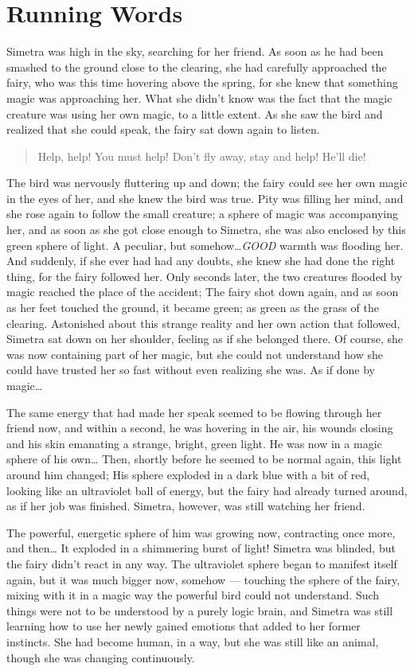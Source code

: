 \chapter{Running Words}
\label{cha:running-words}
Simetra was high in the sky, searching for her friend. As soon as he had been smashed to the ground close to the clearing, she had carefully approached the fairy, who was this time hovering above the spring, for she knew that something magic was approaching her. What she didn't know was the fact that the magic creature was using her own magic, to a little extent. As she saw the bird and realized that she could speak, the fairy sat down again to listen.
\begin{verse}
Help, help! You must help! Don't fly away, stay and help! He'll die!  
\end{verse}
The bird was nervously fluttering up and down; the fairy could see her own magic in the eyes of her, and she knew the bird was true.
Pity was filling her mind, and she rose again to follow the small creature; a sphere of magic was accompanying her, and as soon as she got close enough to Simetra,
she was also enclosed by this green sphere of light. A peculiar, but somehow\dots \emph{GOOD} warmth was flooding her. And suddenly, if she ever had had any doubts, she knew she had done the right thing, for the fairy followed her. Only seconds later, the two creatures flooded by magic reached the place of the accident; The fairy shot down again, and as soon as her feet touched the ground, it became green; as green as the grass of the clearing. Astonished about this strange reality and her own action that followed, Simetra sat down on her shoulder, feeling as if she belonged there. Of course, she was now containing part of her magic, but she could not understand how she could have trusted her so fast without even realizing she was. As if done by magic\dots

The same energy that had made her speak seemed to be flowing through her friend now, and within a second, he was hovering in the air, his wounds closing and his skin emanating a strange, bright, green light. He was now in a magic sphere of his own\dots
Then, shortly before he seemed to be normal again, this light around him changed; His sphere exploded in a dark blue with a bit of red, looking like an ultraviolet ball of energy, but the fairy had already turned around, as if her job was finished. Simetra, however, was still watching her friend.

The powerful, energetic sphere of him was growing now, contracting once more, and then\dots
It exploded in a shimmering burst of light! 
Simetra was blinded, but the fairy didn't react in any way. The ultraviolet sphere began to manifest itself again, but it was much bigger now, somehow --- touching the sphere of the fairy, mixing with it in a magic way the powerful bird could not understand. Such things were not to be understood by a purely logic brain, and Simetra was still learning how to use her newly gained emotions that added to her former instincts. She had become human, in a way, but she was still like an animal, though she was changing continuously.

